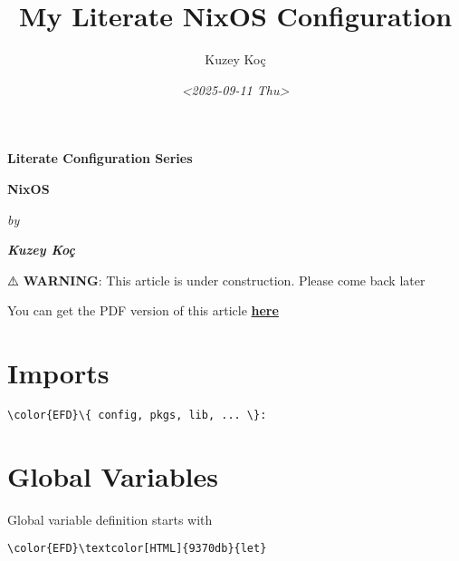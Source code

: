 \documentclass[14pt]{article}
\author{Kuzey Koç}
\date{\textit{<2025-09-11 Thu>}}
\title{My Literate NixOS Configuration}
\let\oldhref\href
\renewcommand{\href}[2]{\oldhref{#1}{\textbf{#2}}}
\begin{document}


\begin{titlepage}
  \BgThispage
  \color{covertext}
  \centering
  \vspace*{3cm}
  {\fontsize{25pt}{35pt}\bfseries Literate Configuration Series \par}
  \vspace{0.5cm}
  {\fontsize{60pt}{72pt}\bfseries NixOS \par}
  \vspace{1cm}
  {\fontsize{18pt}{20pt}\itshape by \par}
  \vspace{0.5cm}
  {\fontsize{23pt}{27pt}\itshape{\bfseries Kuzey Koç} \par}
  \vfill
\end{titlepage}

\color{gruv-fg}

\newpage
\tableofcontents
\newpage

\begin{warning}
⚠️ \textbf{WARNING}: This article is under construction. Please come back later
\end{warning}

You can get the PDF version of this article \href{file:///home/savolla/project/publishing/savolla.github.io/content/posts/my-literate-nixos-config/index.pdf}{here}
\section{Imports}
\label{sec:org3012ceb}
\begin{Code}
\begin{Verbatim}
\color{EFD}\{ config, pkgs, lib, ... \}:
\end{Verbatim}
\end{Code}
\section{Global Variables}
\label{sec:org5629d0b}
Global variable definition starts with
\begin{Code}
\begin{Verbatim}
\color{EFD}\textcolor[HTML]{9370db}{let}
\end{Verbatim}
\end{Code}
\end{document}
